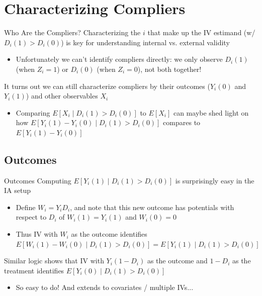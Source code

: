 \documentclass{beamer}
\begin{document}
\section{Characterizing Compliers}

\begin{frame}{Who Are the Compliers?}
Characterizing the $i$ that make up the IV estimand (w/$D_i(1)>D_i(0)$) is key for understanding internal vs. external validity \smallskip
\begin{itemize}
\item Unfortunately we can't identify compliers directly: we only observe $D_i(1)$ (when $Z_i=1$) or $D_i(0)$ (when $Z_i=0$), not both together!
\end{itemize}\bigskip\pause{}
It turns out we can still characterize compliers by their outcomes ($Y_i(0)$ and $Y_i(1)$) and other observables $X_i$\smallskip
\begin{itemize}
\item Comparing $E[X_i\mid D_i(1)>D_i(0)]$ to $E[X_i]$ can maybe shed light on how $E[Y_i(1)-Y_i(0)\mid D_i(1)>D_i(0)]$ compares to $E[Y_i(1)-Y_i(0)]$
\end{itemize}
\end{frame}

\subsection{Outcomes}
\begin{frame}{Outcomes}
Computing $E[Y_i(1)\mid D_i(1)>D_i(0)]$ is surprisingly easy in the IA setup\smallskip
\begin{itemize}
\item Define $W_i=Y_iD_i$, and note that this new outcome has potentials with respect to $D_i$ of $W_i(1)=Y_i(1)$ and $W_i(0)=0$\smallskip\pause{}
\item Thus IV with $W_i$ as the outcome identifies $E[W_i(1)-W_i(0)\mid D_i(1)>D_i(0)]=E[Y_i(1)\mid D_i(1)>D_i(0)]$
\end{itemize}\medskip\pause{}
Similar logic shows that IV with $Y_i(1-D_i)$ as the outcome and $1-D_i$ as the treatment identifies $E[Y_i(0)\mid D_i(1)>D_i(0)]$\smallskip
\begin{itemize}
\item So easy to do! And extends to covariates / multiple IVs...
\end{itemize}
\end{frame}
\end{document}
